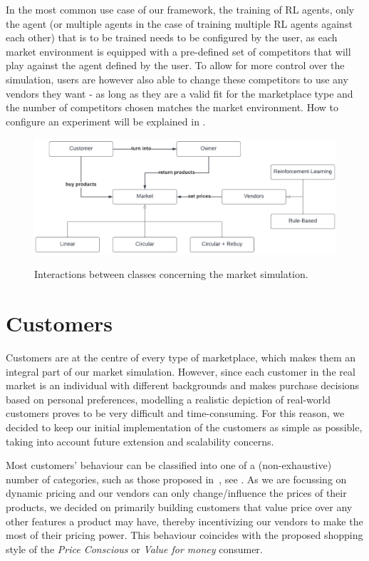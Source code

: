 In the most common use case of our framework, the training of RL agents, only the agent (or multiple agents in the case of training multiple RL agents against each other) that is to be trained needs to be configured by the user, as each market environment is equipped with a pre-defined set of competitors that will play against the agent defined by the user. To allow for more control over the simulation, users are however also able to change these competitors to use any vendors they want - as long as they are a valid fit for the marketplace type and the number of competitors chosen matches the market environment. How to configure an experiment will be explained in .

\begin{figure}[t]
	\centering
	\includegraphics[width = \textwidth]{images/overview_diagram.pdf}\\
	\caption{Interactions between classes concerning the market simulation.\\}\label{fig:OverviewDiagram}
\end{figure}

\section{Customers}\label{sec:Customers}

Customers are at the centre of every type of marketplace, which makes them an integral part of our market simulation. However, since each customer in the real market is an individual with different backgrounds and makes purchase decisions based on personal preferences, modelling a realistic depiction of real-world customers proves to be very difficult and time-consuming. For this reason, we decided to keep our initial implementation of the customers as simple as possible, taking into account future extension and scalability concerns.

Most customers' behaviour can be classified into one of a (non-exhaustive) number of categories, such as those proposed in~\cite{ShoppingStyles}, see . As we are focussing on dynamic pricing and our vendors can only change/influence the prices of their products, we decided on primarily building customers that value price over any other features a product may have, thereby incentivizing our vendors to make the most of their pricing power. This behaviour coincides with the proposed shopping style of the \emph{Price Conscious} or \emph{Value for money} consumer.

